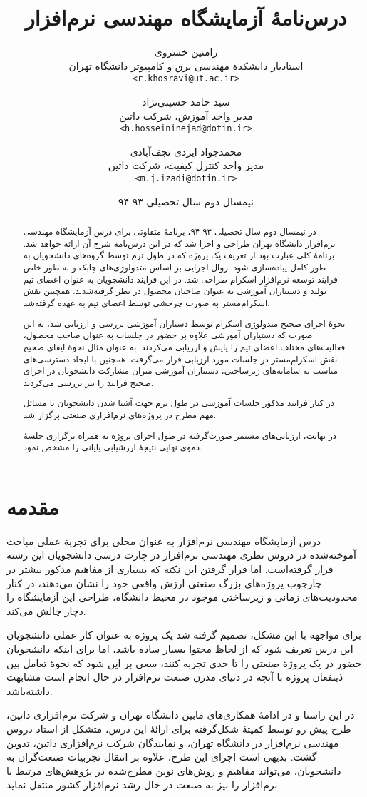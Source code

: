 \documentclass[a4paper,notitlepage]{report}
\title{درس‌نامهٔ آزمایشگاه مهندسی نرم‌افزار}
\author{
رامتین خسروی\\\small{استادیار دانشکدهٔ مهندسی برق و کامپیوتر دانشگاه تهران}\\
\small\texttt{<r.khosravi@ut.ac.ir>}\and
سید حامد حسینی‌نژاد\\\small{مدیر واحد آموزش، شرکت داتین}\\
\small\texttt{<h.hosseininejad@dotin.ir>}\and
محمدجواد ایزدی نجف‌آبادی\\\small{مدیر واحد کنترل کیفیت، شرکت داتین}\\
\small\texttt{<m.j.izadi@dotin.ir>}
}
\date{نیمسال دوم سال تحصیلی ۹۳-۹۴}
\begin{document}
\maketitle
\tableofcontents
\begin{abstract}
در نیمسال دوم سال تحصیلی ۹۳-۹۴، برنامهٔ متفاوتی برای درس آزمایشگاه مهندسی نرم‌افزار دانشگاه تهران طراحی و اجرا شد
که در این درس‌نامه شرح آن ارائه خواهد شد.
برنامهٔ کلی عبارت بود از تعریف یک پروژه که در طول ترم توسط گروه‌های دانشجویان به طور کامل پیاده‌سازی شود.
روال اجرایی بر اساس متدولوژی‌های چابک و به طور خاص فرایند توسعه نرم‌افزار اسکرام طراحی شد.
در این فرایند دانشجویان به عنوان اعضای تیم تولید و دستیاران آموزشی به عنوان صاحبان محصول در نظر گرفته‌شدند.
همچنین نقش اسکرام‌مستر به صورت چرخشی توسط اعضای تیم به عهده گرفته‌شد.

نحوهٔ اجرای صحیح متدولوژی اسکرام توسط دسیاران آموزشی بررسی و ارزیابی شد،
به این صورت که دستیاران آموزشی علاوه بر حضور در جلسات به عنوان صاحب محصول، فعالیت‌های مختلف اعضای تیم را پایش و ارزیابی می‌کردند.
به عنوان مثال نحوهٔ ایفای صحیح نقش اسکرام‌مستر در جلسات مورد ارزیابی قرار می‌گرفت.
همچنین با ایجاد دسترسی‌های مناسب به سامانه‌های زیرساختی، دستیاران آموزشی میزان مشارکت دانشجویان در اجرای صحیح فرایند را نیز بررسی می‌کردند.

در کنار فرایند مذکور جلسات آموزشی در طول ترم جهت آشنا شدن دانشجویان با مسائل مهم مطرح در پروژه‌های نرم‌افزاری صنعتی برگزار شد.

در نهایت، ارزیابی‌های مستمر صورت‌گرفته در طول اجرای پروژه به همراه برگزاری جلسهٔ دموی نهایی نتیجهٔ ارزشیابی پایانی را مشخص نمود.
\end{abstract}
\chapter{مقدمه}
درس آزمایشگاه مهندسی نرم‌افزار به عنوان محلی برای تجربهٔ عملی مباحث آموخته‌شده در دروس نظری مهندسی نرم‌افزار در چارت درسی دانشجویان این رشته قرار گرفته‌است.
اما قرار گرفتن این نکته که بسیاری از مفاهیم مذکور بیشتر در چارچوب پروژه‌های بزرگ صنعتی ارزش واقعی خود را نشان می‌دهند، 
در کنار محدودیت‌های زمانی و زیرساختی موجود در محیط دانشگاه، طراحی این آزمایشگاه را دچار چالش می‌کند.

برای مواجهه با این مشکل، تصمیم گرفته شد یک پروژه به عنوان کار عملی دانشجویان این درس تعریف شود که از لحاظ محتوا بسیار ساده باشد،
اما برای اینکه  دانشجویان حضور در یک پروژهٔ صنعتی را تا حدی تجربه کنند، سعی بر این شود که نحوهٔ تعامل بین ذینفعان پروژه
با آنچه در دنیای مدرن صنعت نرم‌افزار در حال انجام است مشابهت داشته‌باشد.


در این راستا و در ادامهٔ همکاری‌های مابین دانشگاه تهران و شرکت نرم‌افزاری داتین، طرح پیش رو توسط کمیتهٔ شکل‌گرفته برای ارائهٔ این درس،
متشکل از استاد دروس مهندسی نرم‌افزار در دانشگاه تهران، و نمایندگان شرکت نرم‌افزاری داتین، تدوین گشت.
بدیهی است اجرای این طرح، علاوه بر  انتقال تجربیات صنعت‌گران به دانشجویان، می‌تواند مفاهیم و روش‌های نوین مطرح‌شده در پژوهش‌های مرتبط با نرم‌افزار را نیز
به صنعت در حال رشد نرم‌افزار کشور منتقل نماید.
\end{document}
